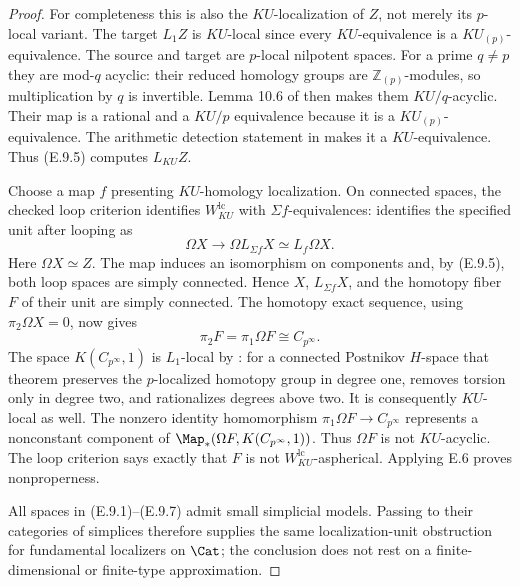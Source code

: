 \begin{proof}
For completeness this is also the $KU$-localization of $Z$,
not merely its $p$-local variant. The target $L_1Z$ is
$KU$-local since every $KU$-equivalence is a
$KU_{(p)}$-equivalence. The source and target are $p$-local
nilpotent spaces. For a prime $q\ne p$ they are mod-$q$
acyclic: their reduced homology groups are $\mathbb Z_{(p)}$-modules,
so multiplication by $q$ is invertible. Lemma 10.6 of
\citet{EH5Bousfield1997} then makes them $KU/q$-acyclic.
Their map is a rational and a $KU/p$ equivalence because it is a
$KU_{(p)}$-equivalence. The arithmetic detection statement in
\citet[Theorem 10.1]{EH5Bousfield1997} makes it a $KU$-equivalence.
Thus (E.9.5) computes $L_{KU}Z$.

Choose a map $f$ presenting $KU$-homology localization.
On connected spaces, the checked loop criterion identifies
$W^{\mathrm{lc}}_{KU}$ with $\Sigma f$-equivalences:
\citet[Theorem 5.2]{EH5Bousfield1997} identifies the specified
unit after looping as
\[
 \Omega X\longrightarrow\Omega L_{\Sigma f}X
            \simeq L_f\Omega X.
                                                               \tag{E.9.6}
\]
Here $\Omega X\simeq Z$. The map induces an isomorphism on
components and, by (E.9.5), both loop spaces are simply connected.
Hence $X$, $L_{\Sigma f}X$, and the homotopy fiber $F$ of their
unit are simply connected. The homotopy exact sequence, using
$\pi_2\Omega X=0$, now gives
\[
             \pi_2F=\pi_1\Omega F
                      \cong C_{p^\infty}.              \tag{E.9.7}
\]
The space $K(C_{p^\infty},1)$ is $L_1$-local by
\citet[Theorem 7.4]{EH5Bousfield2001}: for a connected
Postnikov $H$-space that theorem preserves the $p$-localized
homotopy group in degree one, removes torsion only in degree two,
and rationalizes degrees above two. It is consequently $KU$-local
as well. The nonzero identity homomorphism
$\pi_1\Omega F\to C_{p^\infty}$ represents a nonconstant component
of $\Map_*(\Omega F,K(C_{p^\infty},1))$.
Thus $\Omega F$ is not $KU$-acyclic. The loop criterion says
exactly that $F$ is not $W^{\mathrm{lc}}_{KU}$-aspherical.
Applying E.6 proves nonproperness.

All spaces in (E.9.1)--(E.9.7) admit small simplicial models.
Passing to their categories of simplices therefore supplies the
same localization-unit obstruction for fundamental localizers on
$\Cat$; the conclusion does not rest on a finite-dimensional or
finite-type approximation.
\end{proof}
